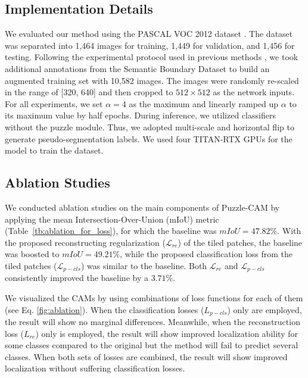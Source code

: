 \documentclass{article}
\begin{document}
\subsection{Implementation Details}
\label{ssec:implementation}





We evaluated our method using the PASCAL VOC 2012 dataset \cite{everingham2010pascal}.
The dataset was separated into 1,464 images for training, 1,449 for validation, and 1,456 for testing. 
Following the experimental protocol used in previous methods \cite{ahn2018learning, Wang_2020_CVPR, lee2019ficklenet}, we took additional annotations from the Semantic Boundary Dataset \cite{hariharan2011semantic} to build an augmented training set with 10,582 images. 
The images were randomly re-scaled in the range of [320, 640] and then cropped to $512 \times 512$ as the network inputs. 
For all experiments, we set $\alpha = 4$ as the maximum and linearly ramped up $\alpha$ to its maximum value by half epochs.
During inference, we utilized classifiers without the puzzle module.
Thus, we adopted multi-scale and horizontal flip to generate pseudo-segmentation labels.
We used four TITAN-RTX GPUs for the model to train the dataset.






\subsection{Ablation Studies}
\label{ssec:ablation}

We conducted ablation studies on the main components of Puzzle-CAM by applying the mean Intersection-Over-Union (mIoU) metric (Table~\ref{tb:ablation_for_loss}), for which the baseline was $mIoU = 47.82\%$. 
With the proposed reconstructing regularization ($\mathcal{L}_{re}$) of the  tiled patches, the baseline was boosted to $mIoU = 49.21\%$, while the proposed classification loss from the tiled patches ($\mathcal{L}_{p-cls}$) was similar to the baseline. 
Both $\mathcal{L}_{re}$ and $\mathcal{L}_{p-cls}$ consistently improved the baseline by a $3.71\%$. 



We visualized the CAMs by using combinations of loss functions for each of them (see Eq. \ref{fig:ablation}).
When the classification losses ($L_{p-cls}$) only are employed, the result will show no marginal differences.
Meanwhile, when the reconstruction loss ($L_{re}$) only is employed, the result will show improved localization ability for some classes compared to the original but the method will fail to predict several classes.
When both sets of losses are combined, the result will show improved localization without suffering classification losses.
\end{document}
